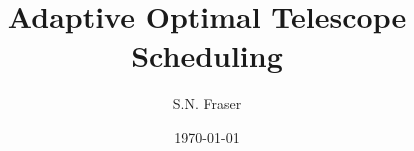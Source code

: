 \documentclass[12pt,a4paper]{article}
\begin{document}
\setlength{\parindent}{5mm}
\setlength{\parskip}{10pt plus2mm minus2mm}
\thispagestyle{empty}

\title{Adaptive Optimal Telescope Scheduling}
\author{S.N. Fraser}
\date{\today}
\maketitle






\end{document}
